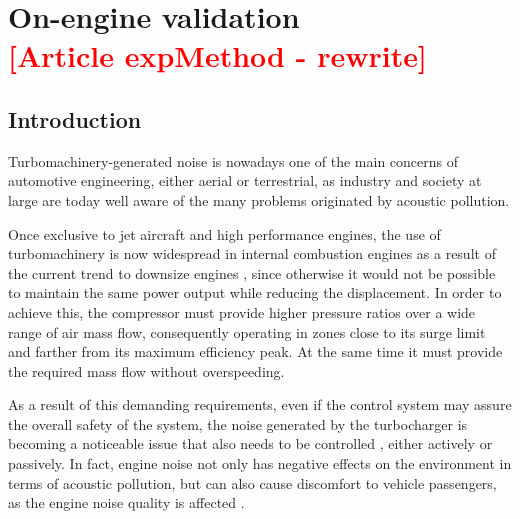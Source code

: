 \chapter{On-engine validation\\ \textcolor{red}{[Article expMethod - rewrite]}}
\label{cap:engine}


\noindent \section{Introduction}\label{sec:intro}
Turbomachinery-generated noise is nowadays one of the main concerns of automotive engineering, either aerial or terrestrial, as industry and society at large are today well aware of the many problems originated by acoustic pollution.

Once exclusive to jet aircraft and high performance engines, the use of turbomachinery is now widespread in internal combustion engines as a result of the current trend to downsize engines \cite{knecht2008diesel}, since otherwise it would not be possible to maintain the same power output while reducing the displacement. In order to achieve this, the compressor must provide higher pressure ratios over a wide range of air mass flow, consequently operating in zones close to its surge limit \cite{galindo2008experiments} and farther from its maximum efficiency peak. At the same time it must provide the required mass flow without overspeeding.

As a result of this demanding requirements, even if the control system may assure the overall safety of the system, the noise generated by the turbocharger is becoming a noticeable issue that also needs to be controlled \cite{gonzalez2003sound}, either actively or passively. In fact, engine noise not only has negative effects on the environment in terms of acoustic pollution, but can also cause discomfort to vehicle passengers, as the engine noise quality is affected \cite{brizon2012combining,nor2008index}.


